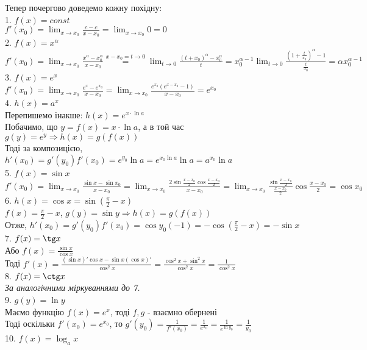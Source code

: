 \documentclass[a4paper, 14pt]{extarticle}
\def\huge{\displaystyle}
\def\bigline{\vspace{5mm}\\}
\theoremstyle{theoremdd}
\theoremstyle{theoremdd}
\theoremstyle{theoremdd}
\theoremstyle{theoremdd}
\theoremstyle{theoremdd}
\theoremstyle{theoremdd}
\theoremstyle{theoremdd}
\theoremstyle{theoremdd}
\begin{document}
Тепер почергово доведемо кожну похідну:\\
1. $f(x) = const$\\
$f'(x_0) = \huge \lim_{x \to x_0} \frac{c-c}{x-x_0} = \lim_{x \to x_0} 0 = 0$
\bigline
2. $f(x) = x^{\alpha}$\\
$f'(x_0) = \huge \lim_{x \to x_0} \frac{x^{\alpha} - x_0^{\alpha}}{x-x_0} \overset{x-x_0 = t \to 0}{=} \lim_{t \to 0} \frac{(t+x_0)^{\alpha} - x_0^{\alpha}}{t} = x_0^{\alpha-1} \lim_{t \to 0} \frac{\left(1 + \frac{t}{x_0}\right)^{\alpha} - 1}{\frac{t}{x_0}} = \alpha x_0^{\alpha-1}$
\bigline
3. $f(x) = e^x$\\
$f'(x_0) = \huge \lim_{x \to x_0} \frac{e^x-e^{x_0}}{x-x_0} = \lim_{x \to x_0} \frac{e^{x_0}(e^{x-x_0}-1)}{x-x_0} = e^{x_0}$
\bigline
4. $h(x) = a^x$\\
Перепишемо інакше: $h(x) = e^{x \cdot \ln a}$\\
Побачимо, що $y = f(x) = x \cdot \ln a$, а в той час $g(y) = e^y \Rightarrow h(x)=g(f(x))$\\
Тоді за композицією, \\ $h'(x_0) = g'(y_0) f'(x_0) = e^{y_0} \ln a = e^{x_0 \ln a} \ln a = a^{x_0} \ln a$
\bigline
5. $f(x) = \sin x$\\
$f'(x_0) = \huge \lim_{x \to x_0} \frac{\sin x - \sin x_0}{x-x_0} = \lim_{x \to x_0} \frac{2 \sin \frac{x-x_0}{2} \cos \frac{x-x_0}{2}}{x-x_0} = \lim_{x \to x_0} \frac{\sin \frac{x-x_0}{2}}{\frac{x-x_0}{2}} \cos \frac{x-x_0}{2} = \cos x_0$
\bigline
6. $h(x) = \huge \cos x = \sin \left(\frac{\pi}{2} - x \right)$\\
$f(x) = \huge \frac{\pi}{2} - x$, $g(y) = \sin y \Rightarrow h(x) = g(f(x))$\\
Отже, $h'(x_0) = g'(y_0)f'(x_0) = \cos y_0 (-1) = \huge -\cos \left(\frac{\pi}{2} - x \right) = -\sin x$
\bigline
7. $f(x) = \tg x$\\
Або $f(x) = \huge \frac{\sin x}{\cos x}$\\
Тоді $f'(x) = \huge \frac{(\sin x)' \cos x - \sin x (\cos x)'}{\cos^2 x} = \frac{\cos^2 x + \sin^2x}{\cos^2 x} = \frac{1}{\cos^2 x}$
\bigline
8. $f(x) = \ctg x$\\
\textit{За аналогічними міркуваннями до 7.}
\bigline
9. $g(y) = \ln y$\\
Маємо функцію $f(x) = e^x$, тоді $f,g$ - взаємно обернені\\
Тоді оскільки $f'(x_0) = e^{x_0}$, то $g'(y_0) = \huge \frac{1}{f'(x_0)} = \frac{1}{e^{x_0}} = \frac{1}{e^{\ln y_0}} = \frac{1}{y_0}$
\bigline
10. $f(x) = \log_a x$\\
\end{document}
